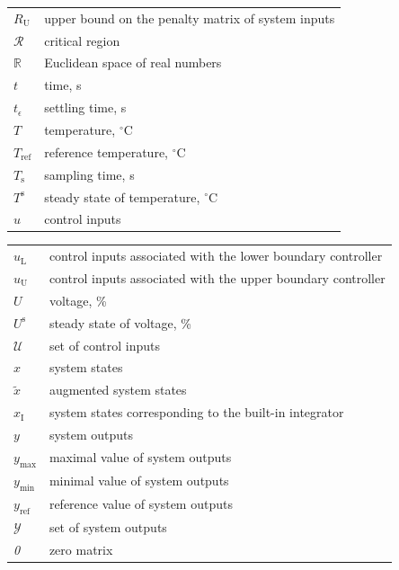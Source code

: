 \documentclass[preprint,12pt]{elsarticle}
\begin{document}
\begin{tabular}{ l l }
			$R_{\mathrm{U}}$ & upper bound on the penalty matrix of system inputs \\
			$\mathcal{R}$ & critical region \\
			$\mathbb{R}$ & Euclidean space of real numbers \\
			$t$ & time, s \\
			$t_{\epsilon}$ & settling time, s \\
			$T$ & temperature, $^{\circ}\mathrm{C}$ \\
			$T_{\mathrm{ref}}$ & reference temperature, $^{\circ}\mathrm{C}$ \\
			$T_{\mathrm{s}}$ & sampling time, s \\
			$T^{\mathrm{s}}$ & steady state of temperature, $^{\circ}\mathrm{C}$ \\
			$u$ & control inputs \\
		\end{tabular}
	
	
		\begin{tabular}{ l l }
			$u_{\mathrm{L}}$ & control inputs associated with the lower boundary controller\\
			$u_{\mathrm{U}}$ & control inputs associated with the upper boundary controller\\
			$U$ & voltage, \% \\
			$U^{\mathrm{s}}$ & steady state of voltage, \% \\
			$\mathcal{U}$ & set of control inputs \\			
			$x$ & system states \\
			$\widetilde{x}$ & augmented system states \\
			$x_{\mathrm{I}}$ & system states corresponding to the built-in integrator \\
			$y$ & system outputs \\
			$y_\mathrm{\max}$ & maximal value of system outputs \\
			$y_\mathrm{\min}$ & minimal value of system outputs \\
			$y_\mathrm{ref}$ & reference value of system outputs \\
			$\mathcal{Y}$ & set of system outputs \\
			\textit{0} & zero matrix
		\end{tabular}
	
\end{document}
